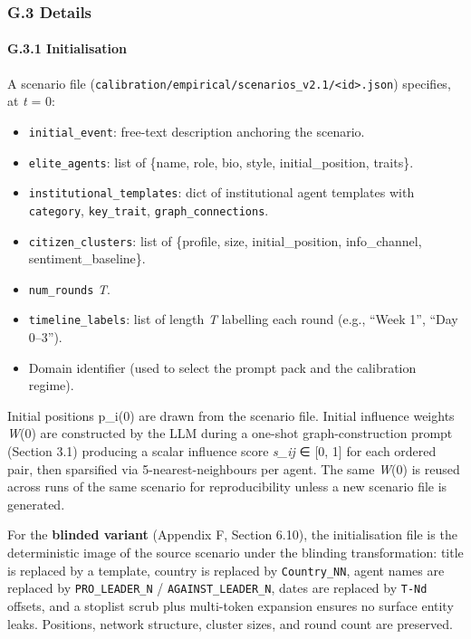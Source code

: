 \documentclass[
]{article}
\providecommand{\tightlist}{%
  \setlength{\itemsep}{0pt}\setlength{\parskip}{0pt}}
\begin{document}
\subsubsection{G.3 Details}\label{g.3-details}

\paragraph{G.3.1 Initialisation}\label{g.3.1-initialisation}

A scenario file
(\texttt{calibration/empirical/scenarios\_v2.1/\textless{}id\textgreater{}.json})
specifies, at \emph{t} = 0:

\begin{itemize}
\tightlist
\item
  \texttt{initial\_event}: free-text description anchoring the scenario.
\item
  \texttt{elite\_agents}: list of \{name, role, bio, style,
  initial\_position, traits\}.
\item
  \texttt{institutional\_templates}: dict of institutional agent
  templates with \texttt{category}, \texttt{key\_trait},
  \texttt{graph\_connections}.
\item
  \texttt{citizen\_clusters}: list of \{profile, size,
  initial\_position, info\_channel, sentiment\_baseline\}.
\item
  \texttt{num\_rounds} \emph{T}.
\item
  \texttt{timeline\_labels}: list of length \emph{T} labelling each
  round (e.g., ``Week 1'', ``Day 0--3'').
\item
  Domain identifier (used to select the prompt pack and the calibration
  regime).
\end{itemize}

Initial positions p\_i(0) are drawn from the scenario file. Initial
influence weights \emph{W}(0) are constructed by the LLM during a
one-shot graph-construction prompt (Section 3.1) producing a scalar
influence score \emph{s\_ij} ∈ {[}0, 1{]} for each ordered pair, then
sparsified via 5-nearest-neighbours per agent. The same \emph{W}(0) is
reused across runs of the same scenario for reproducibility unless a new
scenario file is generated.

For the \textbf{blinded variant} (Appendix F, Section 6.10), the
initialisation file is the deterministic image of the source scenario
under the blinding transformation: title is replaced by a template,
country is replaced by \texttt{Country\_NN}, agent names are replaced by
\texttt{PRO\_LEADER\_N} / \texttt{AGAINST\_LEADER\_N}, dates are
replaced by \texttt{T-Nd} offsets, and a stoplist scrub plus multi-token
expansion ensures no surface entity leaks. Positions, network structure,
cluster sizes, and round count are preserved.
\end{document}

